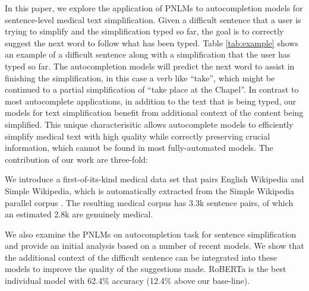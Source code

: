 \documentclass[11pt]{article}
\newcommand{\todo}[1]{\textcolor{red}{TODO: #1}}
\begin{document}
In this paper, we explore the application of PNLMs to autocompletion models for sentence-level medical text simplification. Given a difficult sentence that a user is trying to simplify and the simplification typed so far, the goal is to correctly suggest the next word to follow what has been typed. Table \ref{tab:example} shows an example of a difficult sentence along with a simplification that the user has typed so far. The autocompletion models will predict the next word to assist in finishing the simplification, in this case a verb like ``take'', which might be continued to a partial simplification of ``take place at the Chapel''. In contrast to most autocomplete applications, in addition to the text that is being typed, our models for text  simplification benefit from additional context of the content being simplified. This unique characterisitic allows autocomplete models to efficiently simplify medical text with high quality while correctly preserving crucial information, which cannot be found in most fully-automated models. The contribution of our work are three-fold:

\begin{table}
    \centering
    \caption{An example text simplification autocompletion task.  The user is simplifying the difficult sentence on top and has typed the words on the bottom so far. \todo{AHMAD, put your medical example here.}}
    \label{tab:example}
\end{table}

 We introduce a first-of-its-kind medical data set that pairs English Wikipedia and Simple Wikipedia, which is automatically extracted from the Simple Wikipedia parallel corpus \cite{kauchak2013improving}. The resulting medical corpus has 3.3k sentence pairs, of which an estimated 2.8k are genuinely medical.

 We also examine the PNLMs on autocompletion task for sentence simplification and provide an initial analysis based on a number of recent models. We show that the additional context of the difficult sentence can be integrated into these models to improve the quality of the suggestions made.  RoBERTa is the best individual model with 62.4\% accuracy (12.4\% above our base-line).
\end{document}
